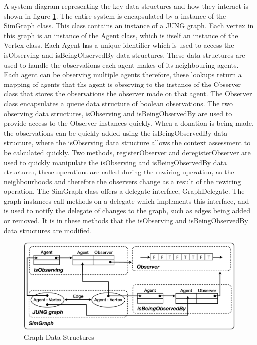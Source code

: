 A system diagram representing the key data structures and how they interact is shown in figure \ref{fig:graphdatastructures}. The entire system is encapsulated by a instance of the SimGraph class. This class contains an instance of a JUNG graph. Each vertex in this graph is an instance of the Agent class, which is itself an instance of the Vertex class. Each Agent has a unique identifier which is used to access the isObserving and isBeingObservedBy data structures. These data structures are used to handle the observations each agent makes of its neighbouring agents. Each agent can be observing multiple agents therefore, these lookups return a mapping of agents that the agent is observing to the instance of the Observer class that stores the observations the observer made on that agent. The Observer class encapsulates a queue data structure of boolean observations. The two observing data structures, isObserving and isBeingObservedBy are used to provide access to the Observer instances quickly. When a donation is being made, the observations can be quickly added using the isBeingObservedBy data structure, where the isObserving data structure allows the context assessment to be calculated quickly. Two methods, registerObserver and deregisterObserver are used to quickly manipulate the isObserving and isBeingObservedBy data structures, these operations are called during the rewiring operation, as the neighbourhoods and therefore the observers change as a result of the rewiring operation.
The SimGraph class offers a delegate interface, GraphDelegate. The graph instances call methods on a delegate which implements this interface, and is used to notify the delegate of changes to the graph, such as edges being added or removed. It is in these methods that the isObserving and isBeingObservedBy data structures are modified.

\begin{figure}[htbp]
	\centering
	\includegraphics[width=\linewidth]{img/GraphDataStructure.pdf}
	\caption{Graph Data Structures}
	\label{fig:graphdatastructures}
\end{figure}

